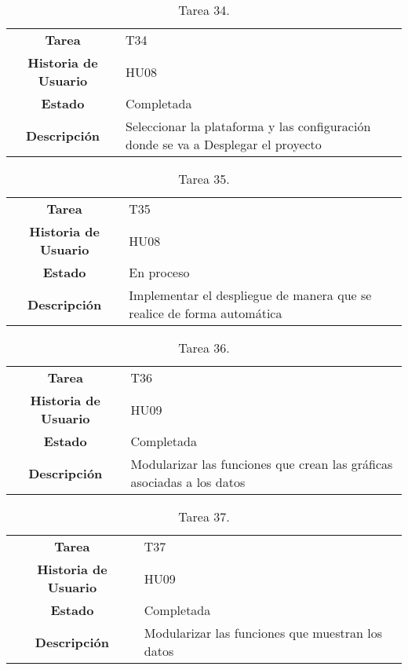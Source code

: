 \begin{table}[H]
	\begin{center}
		\begin{tabular}{| c | p{9cm} |}
			\hline
			
			\textbf{Tarea} & T34 \\
			\textbf{Historia de Usuario} & HU08 \\
			\textbf{Estado} & Completada \\
			\textbf{Descripción} & Seleccionar la plataforma y las configuración donde se va a Desplegar el proyecto \\ \hline
		\end{tabular}
		\caption{Tarea 34.}
	\end{center}
\end{table}

\begin{table}[H]
	\begin{center}
		\begin{tabular}{| c | p{9cm} |}
			\hline
			
			\textbf{Tarea} & T35 \\
			\textbf{Historia de Usuario} & HU08 \\
			\textbf{Estado} & En proceso \\
			\textbf{Descripción} & Implementar el despliegue de manera que se realice de forma automática \\ \hline
		\end{tabular}
		\caption{Tarea 35.}
	\end{center}
\end{table}

\begin{table}[H]
	\begin{center}
		\begin{tabular}{| c | p{9cm} |}
			\hline
			
			\textbf{Tarea} & T36 \\
			\textbf{Historia de Usuario} & HU09 \\
			\textbf{Estado} & Completada \\
			\textbf{Descripción} & Modularizar las funciones que crean las gráficas asociadas a los datos \\ \hline
		\end{tabular}
		\caption{Tarea 36.}
	\end{center}
\end{table}

\begin{table}[H]
	\begin{center}
		\begin{tabular}{| c | p{9cm} |}
			\hline
			
			\textbf{Tarea} & T37 \\
			\textbf{Historia de Usuario} & HU09 \\
			\textbf{Estado} & Completada \\
			\textbf{Descripción} & Modularizar las funciones que muestran los datos \\ \hline
		\end{tabular}
		\caption{Tarea 37.}
	\end{center}
\end{table}

